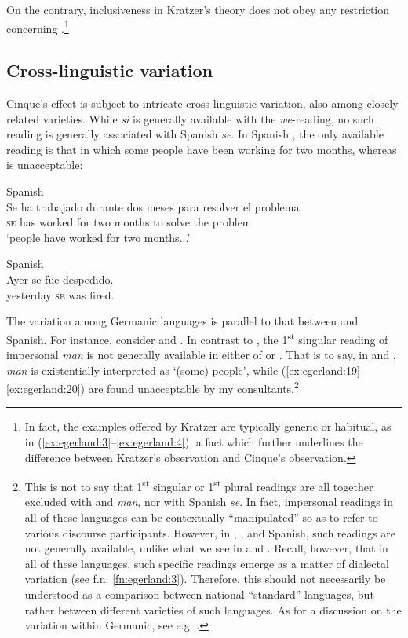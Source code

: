 \documentclass[output=paper]{LSP/langsci}
\begin{document}
On the contrary, inclusiveness in Kratzer’s theory does not obey any restriction concerning .\footnote{In fact, the examples offered by Kratzer are typically generic or habitual, as in (\ref{ex:egerland:3}--\ref{ex:egerland:4}), a fact which further underlines the difference between Kratzer’s observation and Cinque’s observation.}

\subsection{Cross-linguistic variation}\label{sec:egerland:2.4}

Cinque’s effect is subject to intricate cross-linguistic variation, also among closely related varieties. While  \textit{si} is generally available with the \textit{we}-reading, no such reading is generally associated with Spanish \textit{se}. In Spanish , the only available reading is that in which some people have been working for two months, whereas  is unacceptable:

\ea\label{ex:egerland:15}
Spanish\\
\gll Se    ha    trabajado  durante   dos  meses   para  resolver  el    problema.\\
\textsc{se}    has  worked     for     two  months  to    solve     the  problem\\
\glt ‘people have worked for two months...’
\z

\ea\label{ex:egerland:16}
Spanish\\
\gll * Ayer     se  fue   despedido.\\
{} yesterday  \textsc{se}  was   fired.\\
\z

The variation among Germanic languages is parallel to that between  and Spanish. For instance, consider  and . In contrast to , the 1\textsuperscript{st} singular reading of impersonal \textit{man} is not generally available in either of  or . That is to say, in  and , \textit{man} is existentially interpreted as ‘(some) people’, while (\ref{ex:egerland:19}--\ref{ex:egerland:20}) are found unacceptable by my consultants.\footnote{This is not to say that 1\textsuperscript{st} singular or 1\textsuperscript{st} plural readings are all together excluded with  and  \textit{man}, nor with Spanish \textit{se}. In fact, impersonal readings in all of these languages can be contextually “manipulated” so as to refer to various discourse participants. However, in , , and Spanish, such readings are not generally available, unlike what we see in  and . Recall, however, that in all of these languages, such specific readings emerge as a matter of dialectal variation (see f.n. \ref{fn:egerland:3}). Therefore, this should not necessarily be understood as a comparison between national “standard” languages, but rather between different varieties of such languages. As for a discussion on the variation within Germanic, see e.g. \citet{Malamud2006,Hoekstra2010}.}
\end{document}
